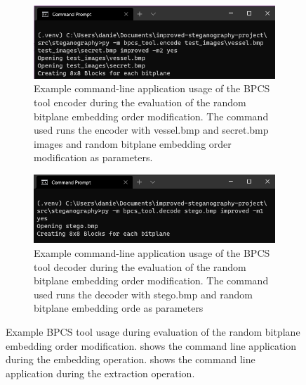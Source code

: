 \documentclass{l4proj}
\begin{document}
\begin{appendices}
\begin{figure}
    \centering
    \begin{subfigure}[b]{0.75\textwidth}
        \includegraphics[width=\textwidth]{images/rb_terminal_encode.png}
        \caption{Example command-line application usage of the BPCS tool encoder during the evaluation of the random bitplane embedding order modification. The command used runs the encoder with vessel.bmp and secret.bmp images and random bitplane embedding order modification as parameters.}
        \label{fig:rb_encode_terminal}
    \end{subfigure}
    \begin{subfigure}[b]{0.75\textwidth}
        \includegraphics[width=\textwidth]{images/vc_terminal_decode.png}
        \caption{Example command-line application usage of the BPCS tool decoder during the evaluation of the random bitplane embedding order modification. The command used runs the decoder with stego.bmp and random bitplane embedding orde as parameters}
        \label{fig:rb_decode_terminal}
    \end{subfigure}
    \caption{Example BPCS tool usage during evaluation of the random bitplane embedding order modification.  shows the command line application during the embedding operation.  shows the command line application during the extraction operation.}
\end{figure}


\end{appendices}
\end{document}
